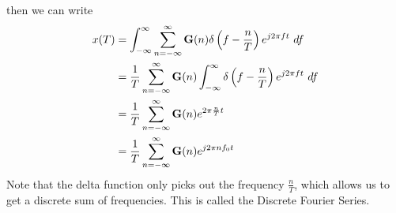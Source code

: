 \begin{itemize}
		then we can write
		\begin{align*}
			x(T) &= \int_{-\infty}^{\infty} \sum_{n=-\infty}^{\infty} \mathbf G(n) \delta\left( f - \frac{n}{T} \right) 
		e^{j 2 \pi ft }\ d  f\\
		&= \frac{1}{T}\sum_{n=-\infty}^{\infty} \mathbf G(n) \int_{-\infty}^{\infty} \delta\left( f - \frac{n}{T} \right) e^{j 2 \pi ft} \ d  f  \\
		&= \frac{1}{T}\sum_{n=-\infty}^{\infty} \mathbf G(n) e^{2 \pi \frac{n}{T}t}\\
		&= \frac{1}{T}\sum_{n=-\infty}^{\infty} \mathbf G(n) e^{j 2 \pi n f_0 t} 
		\end{align*} 
		Note that the delta function only picks out the frequency \( \frac{n}{T} \), which allows us to get a discrete
		sum of frequencies. This is called the Discrete Fourier Series. 
\end{itemize}
